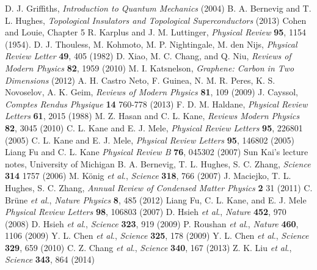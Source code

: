 \documentclass[a4paper,12pt]{article}
\begin{document}
\begin{thebibliography}{1}

\singlespacing
\footnotesize

 D. J. Griffiths, {\em Introduction to Quantum Mechanics} (2004)
 B. A. Bernevig and T. L. Hughes, {\em Topological Insulators and Topological Superconductors} (2013)
 Cohen and Louie, Chapter 5
 R. Karplus and J. M. Luttinger, {\em Physical Review} \textbf{95}, 1154 (1954).
 D. J. Thouless, M. Kohmoto, M. P. Nightingale, M. den Nijs, {\em Physical Review Letter} \textbf{49}, 405 (1982)
 D. Xiao, M. C. Chang, and Q. Niu, {\em Reviews of Modern Physics} \textbf{82}, 1959 (2010)
 M. I. Katsnelson, {\em Graphene: Carbon in Two Dimensions} (2012)
 A. H. Castro Neto, F. Guinea, N. M. R. Peres, K. S. Novoselov, A. K. Geim, {\em Reviews of Modern Physics} \textbf{81}, 109 (2009)
 J. Cayssol, {\em Comptes Rendus Physique} \textbf{14} 760-778 (2013)
 F. D. M. Haldane, {\em Physical Review Letters} \textbf{61}, 2015 (1988)
 M. Z. Hasan and C. L. Kane, {\em Reviews Modern Physics} \textbf{82}, 3045 (2010)
 C. L. Kane and E. J. Mele, {\em Physical Review Letters} \textbf{95}, 226801 (2005)
 C. L. Kane and E. J. Mele, {\em Physical Review Letters} \textbf{95}, 146802 (2005)
 Liang Fu and C. L. Kane {\em Physical Review B} \textbf{76}, 045302 (2007)
 Sun Kai's lecture notes, University of Michigan
 B. A. Bernevig, T. L. Hughes, S. C. Zhang, {\em Science} \textbf{314} 1757 (2006)
 M. K\"onig {\em et al}., {\em Science} \textbf{318}, 766 (2007)
 J. Maciejko, T. L. Hughes, S. C. Zhang, {\em Annual Review of Condensed Matter Physics} \textbf{2} 31 (2011)
 C. Br\"une {\em et al}., {\em Nature Physics} \textbf{8}, 485 (2012)
 Liang Fu, C. L. Kane, and E. J. Mele {\em Physical Review Letters} \textbf{98}, 106803 (2007)
 D. Hsieh {\em et al}., {\em Nature} \textbf{452}, 970 (2008)
 D. Hsieh {\em et al}., {\em Science} \textbf{323}, 919 (2009)
 P. Roushan {\em et al}., {\em Nature} \textbf{460}, 1106 (2009)
 Y. L. Chen {\em et al}., {\em Science} \textbf{325}, 178 (2009)
 Y. L. Chen {\em et al}., {\em Science} \textbf{329}, 659 (2010)
 C. Z. Chang {\em et al}., {\em Science} \textbf{340}, 167 (2013)
 Z. K. Liu {\em et al}., {\em Science} \textbf{343}, 864 (2014)

\end{thebibliography}
\end{document}
